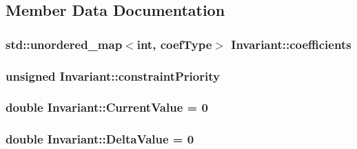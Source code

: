 \subsection{Member Data Documentation}
\hypertarget{class_invariant_a6967f2c1b39c944ffd432528c40d4f23}{
\subsubsection[{coefficients}]{\setlength{\rightskip}{0pt plus 5cm}std\-::unordered\-\_\-map$<$int, {\bf coef\-Type}$>$ Invariant\-::coefficients\hspace{0.3cm}{\ttfamily [protected]}}}\label{class_invariant_a6967f2c1b39c944ffd432528c40d4f23}
\hypertarget{class_invariant_a8d6f849b13550302c1d8e6f864f3962d}{
\subsubsection[{constraint\-Priority}]{\setlength{\rightskip}{0pt plus 5cm}unsigned Invariant\-::constraint\-Priority\hspace{0.3cm}{\ttfamily [protected]}}}\label{class_invariant_a8d6f849b13550302c1d8e6f864f3962d}
\hypertarget{class_invariant_a7208e25abfb820cc51b10659316deef2}{
\subsubsection[{Current\-Value}]{\setlength{\rightskip}{0pt plus 5cm}double Invariant\-::\-Current\-Value = 0\hspace{0.3cm}{\ttfamily [protected]}}}\label{class_invariant_a7208e25abfb820cc51b10659316deef2}
\hypertarget{class_invariant_ad447ae680438882a5c7fdd413ac3f672}{
\subsubsection[{Delta\-Value}]{\setlength{\rightskip}{0pt plus 5cm}double Invariant\-::\-Delta\-Value = 0\hspace{0.3cm}{\ttfamily [protected]}}}\label{class_invariant_ad447ae680438882a5c7fdd413ac3f672}
